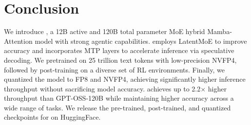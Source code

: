 \section{Conclusion}
\label{sec:conclusion}
We introduce \ourmodel, a 12B active and 120B total parameter MoE hybrid Mamba-Attention model with strong agentic capabilities. \ourmodel employs LatentMoE to improve accuracy and incorporates MTP layers to accelerate inference via speculative decoding. We pretrained \ourmodel on 25 trillion text tokens with low-precision NVFP4, followed by post-training on a diverse set of RL environments. Finally, we quantized the model to FP8 and NVFP4, achieving significantly higher inference throughput without sacrificing model accuracy. \ourmodel achieves up to 2.2$\times$ higher throughput than GPT-OSS-120B while maintaining higher accuracy across a wide range of tasks. We release the pre-trained, post-trained, and quantized checkpoints for \ourmodel on HuggingFace.